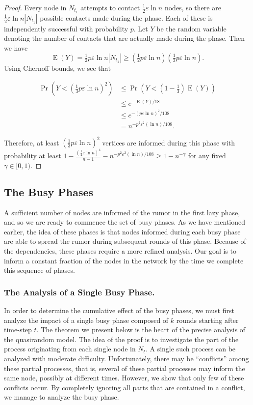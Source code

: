 \documentclass[12pt]{article}
\newcommand{\e}{\varepsilon}
\DeclareMathOperator{\E}{E}
\begin{document}
{\begin{proof}
Every node in $N_{t_1}$ attempts to contact $\frac{1}{2}\e\ln n$ nodes, so there are $\frac{1}{2}\e\ln n|N_{t_1}|$ possible contacts made during the phase. Each of these is independently successful with probability $p$. Let $Y$ be the random variable denoting the number of contacts that are actually made during the phase. Then we have
\begin{equation}
\E(Y)
=	\tfrac{1}{2}p\e\ln n|N_{t_1}|
\geq	\left(\tfrac{1}{2}p\e\ln n\right) \left(\tfrac{1}{3}p\e\ln n\right) .
\end{equation}
Using Chernoff bounds, we see that


\begin{align*}
\Pr\left(Y<\left(\tfrac{1}{3}p\e\ln n	\right)^2	\right)&\leq\Pr\left(Y<\left(1-\tfrac{1}{3}	\right)\E(Y)\right)\\
&\leq e^{-\E(Y)/18}\\
&\leq e^{-(p\e\ln n)^2/108}\\
&=n^{-p^2\e^2(\ln n)/108}.
\end{align*}

Therefore, at least $\left(\frac{1}{3}p\e\ln n	\right)^2$ vertices are informed during this phase with probability at least $1-\frac{\left(\frac{1}{2}\e\ln n\right)^4}{n-1}-n^{-p^2\e^2(\ln n)/108}
\geq	1-n^{-\gamma}$ for any fixed $\gamma \in [0, 1)$.
\end{proof}




\subsection{The Busy Phases}
A sufficient number of nodes are informed of the rumor in the first lazy phase, and so we are ready to commence the set of busy phases. As we have mentioned earlier, the idea of these phases is that
nodes informed during each busy phase are able to spread the rumor during subsequent rounds of this phase. Because of the dependencies, these phases require a more refined analysis. Our goal is to inform a constant fraction of the nodes in the network by the time we complete this sequence of phases.

\subsubsection{The Analysis of a Single Busy Phase.}
In order to determine the cumulative effect of the busy phases, we must first analyze the impact of a single busy phase composed of $k$ rounds starting after time-step $t$. The theorem we present below is the heart of the precise analysis of the quasirandom model. The idea of the proof is to investigate the part of the process originating from each single node in $N_{t}$. A single such process can be analyzed with moderate difficulty. Unfortunately, there may be  ``conflicts'' among these partial processes, that is, several of these partial processes may inform the same node, possibly at different times. However, we show that only few of these conflicts occur. By completely ignoring all parts that are contained in a conflict, we manage to analyze the busy phase.

}
\end{document}
